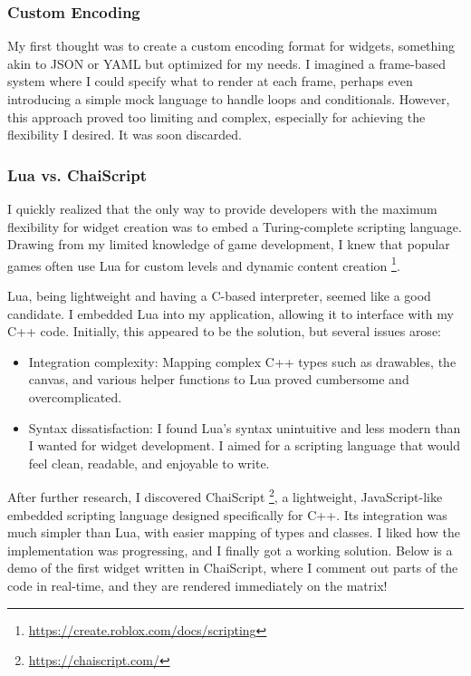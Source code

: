 \subsubsection{Custom Encoding} My first thought was to create a custom encoding format for widgets, something akin to JSON or YAML but optimized for my needs. I imagined a frame-based system where I could specify what to render at each frame, perhaps even introducing a simple mock language to handle loops and conditionals. However, this approach proved too limiting and complex, especially for achieving the flexibility I desired. It was soon discarded.

\subsubsection{Lua vs. ChaiScript} I quickly realized that the only way to provide developers with the maximum flexibility for widget creation was to embed a Turing-complete scripting language. Drawing from my limited knowledge of game development, I knew that popular games often use Lua for custom levels and dynamic content creation \footnote{\url{https://create.roblox.com/docs/scripting}}.

Lua, being lightweight and having a C-based interpreter, seemed like a good candidate. I embedded Lua into my application, allowing it to interface with my C++ code. Initially, this appeared to be the solution, but several issues arose:

    \begin{itemize}
        \item Integration complexity: Mapping complex C++ types such as drawables, the canvas, and various helper functions to Lua proved cumbersome and overcomplicated.
        \item Syntax dissatisfaction: I found Lua's syntax unintuitive and less modern than I wanted for widget development. I aimed for a scripting language that would feel clean, readable, and enjoyable to write.
    \end{itemize}

After further research, I discovered ChaiScript \footnote{\url{https://chaiscript.com/}}, a lightweight, JavaScript-like embedded scripting language designed specifically for C++. Its integration was much simpler than Lua, with easier mapping of types and classes. I liked how the implementation was progressing, and I finally got a working solution. Below is a demo of the first widget written in ChaiScript, where I comment out parts of the code in real-time, and they are rendered immediately on the matrix!

